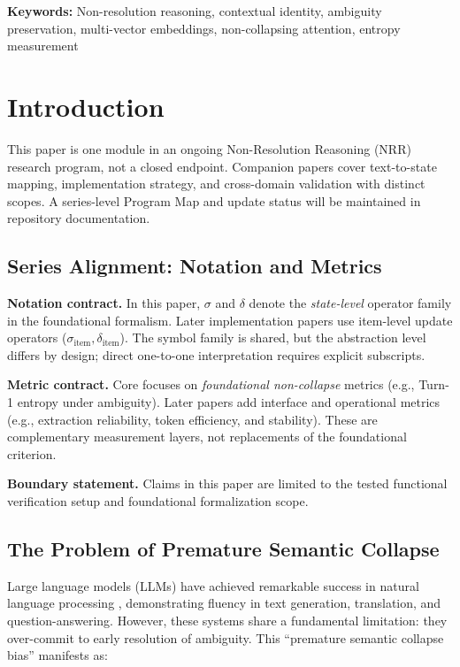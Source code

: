 \documentclass[11pt,a4paper]{article}
\begin{document}
\noindent\textbf{Keywords:} Non-resolution reasoning, contextual identity, ambiguity preservation, multi-vector embeddings, non-collapsing attention, entropy measurement

\section{Introduction}

This paper is one module in an ongoing Non-Resolution Reasoning (NRR) research program, not a closed endpoint. Companion papers cover text-to-state mapping, implementation strategy, and cross-domain validation with distinct scopes. A series-level Program Map and update status will be maintained in repository documentation.

\subsection{Series Alignment: Notation and Metrics}

\textbf{Notation contract.} In this paper, $\sigma$ and $\delta$ denote the
\emph{state-level} operator family in the foundational formalism. Later
implementation papers use item-level update operators
($\sigma_{\text{item}}, \delta_{\text{item}}$). The symbol family is shared, but
the abstraction level differs by design; direct one-to-one interpretation
requires explicit subscripts.

\textbf{Metric contract.} Core focuses on \emph{foundational non-collapse}
metrics (e.g., Turn-1 entropy under ambiguity). Later papers add interface and
operational metrics (e.g., extraction reliability, token efficiency, and
stability). These are complementary measurement layers, not replacements of the
foundational criterion.

\textbf{Boundary statement.} Claims in this paper are limited to the tested
functional verification setup and foundational formalization scope.

\subsection{The Problem of Premature Semantic Collapse}

Large language models (LLMs) have achieved remarkable success in natural language processing \cite{devlin2019bert, radford2018improving}, demonstrating fluency in text generation, translation, and question-answering.
However, these systems share a fundamental limitation: they over-commit to early resolution of ambiguity.
This ``premature semantic collapse bias'' manifests as:
\end{document}
